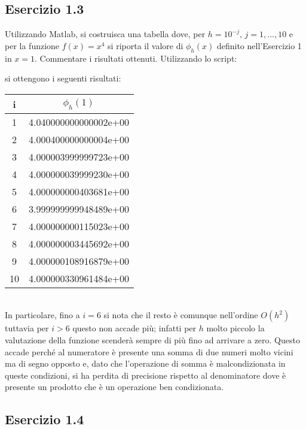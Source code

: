 	\subsection{Esercizio 1.3}
	
Utilizzando Matlab, si costruisca una tabella dove, per $h = 10^{-j}$, $j =1, . . . , 10$ e per la funzione $f(x) = x^{4}$ si riporta il valore di $\phi_h(x)$ definito nell'Esercizio 1 in $x = 1$. Commentare i risultati ottenuti.
\PP
Utilizzando lo script:

si ottengono i seguenti risultati:
\begin{tabular}{ c | c }
i & $\phi_h(1)$ \\
\hline
1  & 4.040000000000002e+00 \\
2  & 4.000400000000004e+00 \\
3  & 4.000003999999723e+00 \\
4  & 4.000000039999230e+00 \\
5  & 4.000000000403681e+00 \\
6  & 3.999999999948489e+00 \\
7  & 4.000000000115023e+00 \\
8  & 4.000000003445692e+00 \\
9  & 4.000000108916879e+00 \\
10 & 4.000000330961484e+00 \\
\end{tabular}\\
In particolare, fino a $i=6$ si nota che il resto è comunque nell'ordine $O(h^2)$ tuttavia per $i>6$ questo non accade più; infatti per $h$ molto piccolo la valutazione della funzione scenderà sempre di più fino ad arrivare a zero. Questo accade perché al numeratore è presente una somma di due numeri molto vicini ma di segno opposto e, dato che l'operazione di somma è malcondizionata in queste condizioni, si ha perdita di precisione rispetto al denominatore dove è presente un prodotto che è un operazione ben condizionata.

	\subsection{Esercizio 1.4}
	
